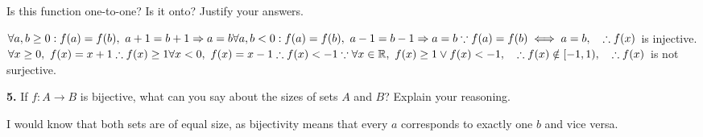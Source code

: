 \documentclass[12pt]{article}
\begin{document}
Is this function one-to-one? Is it onto? Justify your answers.
\begin{adjustwidth}{1.5cm}{}
\begin{minipage}[t][5cm][t]{\linewidth}
    $\displaystyle \forall a, b \geq 0 : f(a) = f(b), \ a+1 = b+1 \Rightarrow a=b
    \\[8pt] \forall a, b < 0 : f(a) = f(b), \ a-1 = b-1 \Rightarrow a=b
    \\[8pt] \because f(a) = f(b) \iff a = b, \quad \therefore f(x)$ is injective.
    \\[8pt] $\forall x \geq 0, \ f(x) = x + 1 \therefore f(x) \geq 1
    \\[8pt] \forall x < 0, \ f(x) = x - 1 \therefore f(x) < -1
    \\[8pt] \because \forall x \in \mathbb{R}, \ f(x) \geq 1 \vee f(x) < -1, \quad \therefore f(x) \notin [-1, 1), \quad \therefore f(x)$ is not surjective.
\end{minipage}
\end{adjustwidth}

\textbf{5.} If $f: A \to B$ is bijective, what can you say about the sizes of sets $A$ and $B$? Explain your reasoning.
\begin{adjustwidth}{1.5cm}{}
\begin{minipage}[t][4cm][t]{\linewidth}
    I would know that both sets are of equal size, as bijectivity means that every $a$ corresponds to exactly one $b$ and vice versa.
\end{minipage}
\end{adjustwidth}
\end{document}
